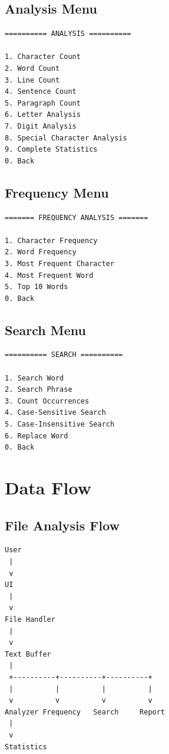 \documentclass[12pt,a4paper]{article}
\begin{document}
\subsection{Analysis Menu}

\begin{verbatim}
========== ANALYSIS ==========

1. Character Count
2. Word Count
3. Line Count
4. Sentence Count
5. Paragraph Count
6. Letter Analysis
7. Digit Analysis
8. Special Character Analysis
9. Complete Statistics
0. Back
\end{verbatim}

\subsection{Frequency Menu}

\begin{verbatim}
======= FREQUENCY ANALYSIS =======

1. Character Frequency
2. Word Frequency
3. Most Frequent Character
4. Most Frequent Word
5. Top 10 Words
0. Back
\end{verbatim}

\subsection{Search Menu}

\begin{verbatim}
========== SEARCH ==========

1. Search Word
2. Search Phrase
3. Count Occurrences
4. Case-Sensitive Search
5. Case-Insensitive Search
6. Replace Word
0. Back
\end{verbatim}


\section{Data Flow}

\subsection{File Analysis Flow}

\begin{verbatim}
User
 |
 v
UI
 |
 v
File Handler
 |
 v
Text Buffer
 |
 +----------+----------+----------+
 |          |          |          |
 v          v          v          v
Analyzer Frequency   Search     Report
 |
 v
Statistics
\end{verbatim}
\end{document}
